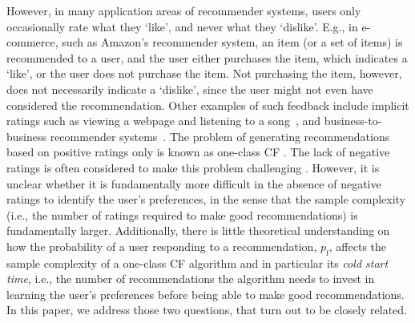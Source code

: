 \documentclass{article}
\newcommand\pf{p_{\mathrm{f}}}
\begin{document}
However, in many application areas of recommender systems, users only occasionally rate what they `like', and never what they `dislike'. 
E.g., in e-commerce, such as Amazon's recommender system, an item (or a set of items) is recommended to a user, and the user either purchases the item, which indicates a `like', or the user does not purchase the item. 
Not purchasing the item, however, does not necessarily indicate a `dislike', since the user might not even have considered the recommendation. 
Other examples of such feedback include implicit ratings such as viewing a webpage and listening to a song~\cite{hu_collaborative_2008}, 
and business-to-business recommender systems~\cite{heckel_scalable_2016}. 
The problem of generating recommendations based on positive ratings only is known as one-class CF  \cite{pan_one-class_2008}. 
The lack of negative ratings is often considered to make this problem challenging \cite{pan_one-class_2008}.  
However, it is unclear whether it is fundamentally more difficult in the absence of negative ratings to identify the user's preferences,
in the sense that 
the sample complexity (i.e., the number of ratings required to make good recommendations) is fundamentally larger. 
Additionally, there is little theoretical understanding on how the probability of a user responding to a recommendation, $\pf$, affects the sample complexity of a one-class CF algorithm and in particular its \emph{cold start time}, i.e., the number of recommendations the algorithm needs to invest in learning the user's preferences before being able to make good recommendations. 
In this paper, we address those two questions, that turn out to be closely related. 
\end{document}
